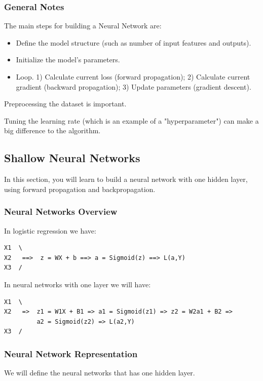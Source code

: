 \subsubsection{General Notes}
The main steps for building a Neural Network are:
\begin{itemize}
    \item Define the model structure (such as number of input features and outputs).
    \item Initialize the model's parameters.
    \item Loop. 1) Calculate current loss (forward propagation); 2) Calculate current gradient (backward propagation); 3) Update parameters (gradient descent).
\end{itemize}

Preprocessing the dataset is important.

Tuning the learning rate (which is an example of a "hyperparameter") can make a big difference to the algorithm.



\subsection{Shallow Neural Networks}
In this section, you will learn to build a neural network with one hidden layer, using forward propagation and backpropagation.

\subsubsection{Neural Networks Overview}
In logistic regression we have:

\begin{lstlisting}
X1  \  
X2   ==>  z = WX + b ==> a = Sigmoid(z) ==> L(a,Y)
X3  /
\end{lstlisting}

In neural networks with one layer we will have:

\begin{lstlisting}
X1  \  
X2   =>  z1 = W1X + B1 => a1 = Sigmoid(z1) => z2 = W2a1 + B2 => 
         a2 = Sigmoid(z2) => L(a2,Y)
X3  /
\end{lstlisting}

\subsubsection{Neural Network Representation}
We will define the neural networks that has one hidden layer.

